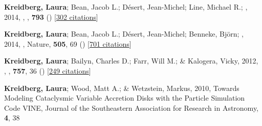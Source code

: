 \item[{\color{numcolor}\scriptsize4}] \textbf{Kreidberg, Laura}; Bean, Jacob L.; D{\'e}sert, Jean-Michel; Line, Michael R.; \etal, 2014, , \apj, \textbf{793} () [\href{https://ui.adsabs.harvard.edu/abs/2014ApJ...793L..27K}{302 citations}]

\item[{\color{numcolor}\scriptsize3}] \textbf{Kreidberg, Laura}; Bean, Jacob L.; D{\'e}sert, Jean-Michel; Benneke, Bj{\"o}rn; \etal, 2014, , Nature, \textbf{505}, 69 () [\href{https://ui.adsabs.harvard.edu/abs/2014Natur.505...69K}{701 citations}]

\item[{\color{numcolor}\scriptsize2}] \textbf{Kreidberg, Laura}; Bailyn, Charles D.; Farr, Will M.; \& Kalogera, Vicky, 2012, , \apj, \textbf{757}, 36 () [\href{https://ui.adsabs.harvard.edu/abs/2012ApJ...757...36K}{249 citations}]

\item[{\color{numcolor}\scriptsize1}] \textbf{Kreidberg, Laura}; Wood, Matt A.; \& Wetzstein, Markus, 2010, Towards Modeling Cataclysmic Variable Accretion Disks with the Particle Simulation Code VINE, Journal of the Southeastern Association for Research in Astronomy, \textbf{4}, 38